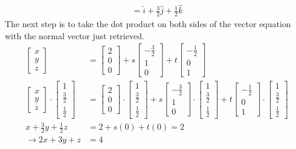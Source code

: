 \begin{solution}
\begin{align*}
= \hat{i} + \frac{3}{2}\hat{j} + \frac{1}{2}\hat{k}
\end{align*}
The next step is to take the dot product on both sides of the vector equation with the normal vector just retrieved.
\begin{align*}
\begin{bmatrix}
x \\
y \\
z
\end{bmatrix}
&=
\begin{bmatrix}
2 \\
0 \\
0
\end{bmatrix}
+ s
\begin{bmatrix}
-\frac{3}{2} \\
1 \\
0
\end{bmatrix}
+ t
\begin{bmatrix}
-\frac{1}{2} \\
0 \\
1
\end{bmatrix} \\
\begin{bmatrix}
x \\
y \\
z
\end{bmatrix}
\cdot
\begin{bmatrix}
1 \\
\frac{3}{2} \\
\frac{1}{2}
\end{bmatrix}
&=
\begin{bmatrix}
2 \\
0 \\
0
\end{bmatrix}
\cdot
\begin{bmatrix}
1 \\
\frac{3}{2} \\
\frac{1}{2}
\end{bmatrix}
+ s
\begin{bmatrix}
-\frac{3}{2} \\
1 \\
0
\end{bmatrix}
\cdot
\begin{bmatrix}
1 \\
\frac{3}{2} \\
\frac{1}{2}
\end{bmatrix}
+ t
\begin{bmatrix}
-\frac{1}{2} \\
0 \\
1
\end{bmatrix}
\cdot
\begin{bmatrix}
1 \\
\frac{3}{2} \\
\frac{1}{2}
\end{bmatrix} \\
x + \frac{3}{2}y + \frac{1}{2}z &= 2 + s(0) + t(0) = 2 \\
\rightarrow 2x+3y+z &= 4
\end{align*}
\end{solution}
